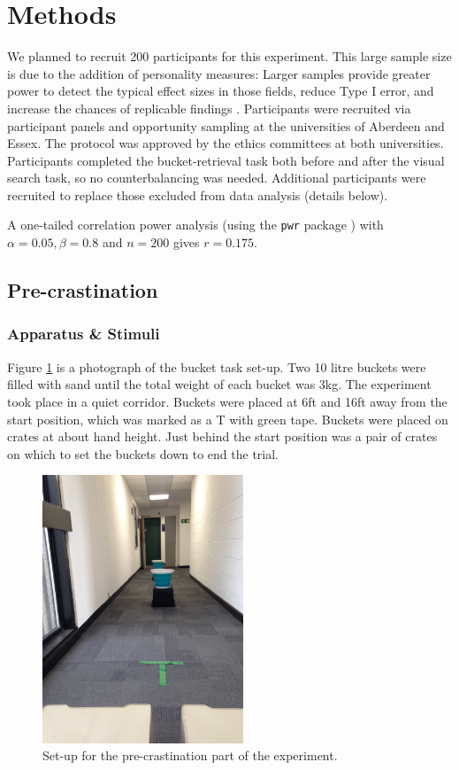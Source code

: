 \documentclass[]{rsos}
\begin{document}
\section{Methods}

We planned to recruit 200 participants for this experiment. This large sample size is due to the addition of personality measures: Larger samples provide greater power to detect the typical effect sizes in those fields, reduce Type I error, and increase the chances of replicable findings \cite{fraley2014}. Participants were recruited via participant panels and opportunity sampling at the universities of Aberdeen and Essex. The protocol was approved by the ethics committees at both universities. Participants completed the bucket-retrieval task both before and after the visual search task, so no counterbalancing was needed. Additional participants were recruited to replace those excluded from data analysis (details below). 

A one-tailed correlation power analysis (using the \texttt{pwr} package \cite{pwr}) with $\alpha=0.05, \beta=0.8$ and $n=200$ gives $r=0.175$.

\subsection{Pre-crastination}
\label{sec:pre-crastination_methods}
\subsubsection{Apparatus \& Stimuli}

Figure \ref{fig:buckets} is a photograph of the bucket task set-up. Two 10 litre buckets were filled with sand until the total weight of each bucket was 3kg. The experiment took place in a quiet corridor. Buckets were placed at 6ft and 16ft away from the start position, which was marked as a T with green tape. Buckets were placed on crates at about hand height. Just behind the start position was a pair of crates on which to set the buckets down to end the trial.

\begin{figure}
\centering
\includegraphics[width=6cm]{Figures/IMG_7939.jpg}
\caption{Set-up for the pre-crastination part of the experiment.}
\label{fig:buckets}
\end{figure}
\end{document}
